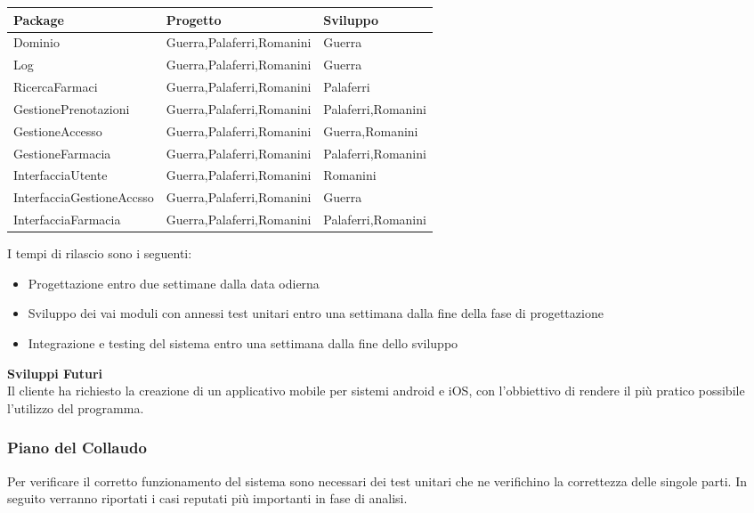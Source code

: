 \begin{tabular} {|P{5cm}|P{5cm}|P{5cm}|} %
    \hline
    \textbf{Package} & \textbf{Progetto} & \textbf{Sviluppo} \\
    \hline
    Dominio  &  Guerra,Palaferri,Romanini  &  Guerra\\
    \hline
    Log  &  Guerra,Palaferri,Romanini & Guerra\\
    \hline
    RicercaFarmaci  &  Guerra,Palaferri,Romanini &  Palaferri \\
    \hline
    GestionePrenotazioni  & Guerra,Palaferri,Romanini & Palaferri,Romanini \\
    \hline
    GestioneAccesso  & Guerra,Palaferri,Romanini & Guerra,Romanini \\
    \hline
    GestioneFarmacia  & Guerra,Palaferri,Romanini & Palaferri,Romanini \\
    \hline
    InterfacciaUtente  & Guerra,Palaferri,Romanini & Romanini \\
    \hline
    InterfacciaGestioneAccsso  & Guerra,Palaferri,Romanini & Guerra\\
    \hline
    InterfacciaFarmacia  & Guerra,Palaferri,Romanini & Palaferri,Romanini \\
    \hline
\end{tabular}
\hfill \break

I tempi di rilascio sono i seguenti:
\begin{itemize}
    \item Progettazione entro due settimane dalla data odierna
    \item Sviluppo dei vai moduli con annessi test unitari entro una settimana dalla fine della fase di progettazione
    \item Integrazione e testing del sistema entro una settimana dalla fine dello sviluppo
\end{itemize}
\hfill \break

\textbf{Sviluppi Futuri}
\\

Il cliente ha richiesto la creazione di un applicativo mobile per sistemi
android e iOS, con l'obbiettivo di rendere il più pratico possibile l'utilizzo
del programma.

\newpage
\subsubsection{Piano del Collaudo}

Per verificare il corretto funzionamento del sistema sono necessari dei test
unitari che ne verifichino la correttezza delle singole parti. In seguito
verranno riportati i casi reputati più importanti in fase di analisi.

